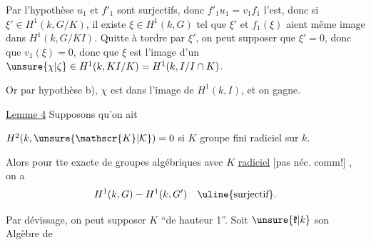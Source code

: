 Par l'hypothèse  $u_1$ et $f'_1$ sont surjectifs, donc $f'_1u_1=v_1f_1$ l'est, donc si $\xi'\in H^1(k,G/K)$, il existe $\xi\in H^1(k,G)$ tel que $\xi'$ et $f_1(\xi)$ aient même image dans $H^1(k,G/KI)$. Quitte à tordre par $\xi'$, on peut supposer que $\xi'=0$, donc que $v_1(\xi)=0$, donc que $\xi$ est  l'image d'un $\unsure{\chi|\zeta}\in H^1(k,KI/K)=H^1(k,I/I\cap K)$.

Or par hypothèse b),  $\chi$ est dans l'image de $H^1(k,I)$, et on gagne.

\uline{Lemme 4} Supposons qu'on ait 

 $H^2(k,\unsure{\mathscr{K}|\mathcal{K}})=0$ si $K$ groupe  fini radiciel sur $k$.

Alors pour tte  exacte de groupes algébriques
avec $K$ \uline{radiciel} [pas néc. comm!] , on a
\[
H^1(k,G)-H^1(k,G')\quad\text{\uline{surjectif}}.
\]

Par dévissage, on peut supposer $K$ ``de hauteur 1''. Soit $\unsure{\mathfrak{k}|k}$ son Algèbre de

